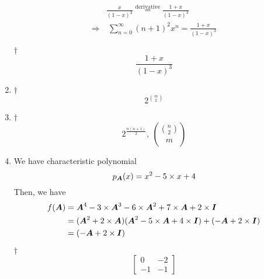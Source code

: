\documentclass[a4paper,12pt]{article}
\begin{document}
\begin{enumerate}
\begin{equation}
\begin{aligned}
            & \frac{x}{(1 - x)^2} \overset{\text{derivative}}= \frac{1 + x}{(1 - x)^3} \\
            \Rightarrow & \ \sum_{n = 0}^{\infty}(n + 1)^2 x^n = \frac{1 + x}{(1 - x)^3}
        \end{aligned}
    \end{equation}
    \begin{answer}{$\dag$}\begin{equation}
        \frac{1 + x}{(1 - x)^3}
        \end{equation}
    \end{answer}
    \item \begin{answer}{$\dag$}\begin{equation}
            2^{\binom{m}{2}}    
        \end{equation}
    \end{answer}
    \item \begin{answer}{$\dag$}\begin{equation}
            2^{\frac{n(n + 1)}{2}}, \ \binom{\binom{n}{2}}{m}    
        \end{equation}
    \end{answer}
    \item We have characteristic polynomial \begin{equation}
        p_{\boldsymbol{A}}(x) = x^2 - 5 \times x + 4
    \end{equation} Then, we have \begin{equation}
        \begin{aligned}
            f(\boldsymbol{A}) & = \boldsymbol{A}^4 - 3 \times \boldsymbol{A}^3 - 6 \times \boldsymbol{A}^2 + 7 \times \boldsymbol{A} + 2 \times \boldsymbol{I} \\
            & = (\boldsymbol{A}^2 + 2 \times \boldsymbol{A})(\boldsymbol{A}^2 - 5 \times \boldsymbol{A} + 4 \times \boldsymbol{I}) + (-\boldsymbol{A} + 2 \times \boldsymbol{I}) \\
            & = (-\boldsymbol{A} + 2 \times \boldsymbol{I})
        \end{aligned}
    \end{equation}
    \begin{answer}{$\dag$}\begin{equation}
            \begin{bmatrix}
                0 & -2 \\
                -1 & -1
            \end{bmatrix}    
        \end{equation}
    \end{answer}

\end{enumerate}
\end{document}
